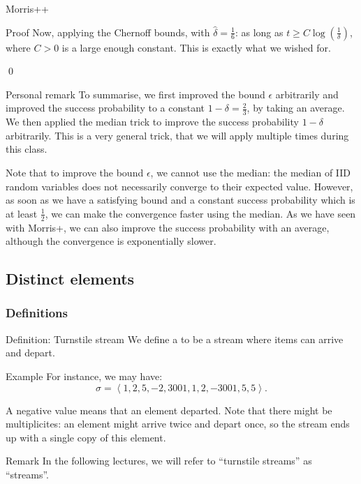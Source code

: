 \documentclass[a4paper]{article}
\begin{document}
\begin{parag}{Morris++}
\begin{subparag}{Proof}
        Now, applying the Chernoff bounds, with $\hat{\delta} = \frac{1}{6}$: 
        as long as $t \geq C \log\left(\frac{1}{\delta}\right)$, where $C > 0$ is a large enough constant. This is exactly what we wished for.
        
        \qed
    \end{subparag}

    \begin{subparag}{Personal remark}
        To summarise, we first improved the bound $\epsilon$ arbitrarily and improved the success probability to a constant $1 - \delta = \frac{2}{3}$, by taking an average. We then applied the median trick to improve the success probability $1 - \delta$ arbitrarily. This is a very general trick, that we will apply multiple times during this class.

        Note that to improve the bound $\epsilon$, we cannot use the median: the median of IID random variables does not necessarily converge to their expected value. However, as soon as we have a satisfying bound and a constant success probability which is at least $\frac{1}{2}$, we can make the convergence faster using the median. As we have seen with Morris+, we can also improve the success probability with an average, although the convergence is exponentially slower.
    \end{subparag}
\end{parag}

\subsection{Distinct elements}
\subsubsection{Definitions}

\begin{parag}{Definition: Turnstile stream}
    We define a  to be a stream where items can arrive and depart.

    \begin{subparag}{Example}
        For instance, we may have:
        \[\sigma = \left\langle 1, 2, 5, -2, 3001, 1, 2, -3001, 5, 5 \right\rangle.\]
        
        A negative value means that an element departed. Note that there might be multiplicites: an element might arrive twice and depart once, so the stream ends up with a single copy of this element.
    \end{subparag}

    \begin{subparag}{Remark}
        In the following lectures, we will refer to ``turnstile streams'' as ``streams''.
    \end{subparag}
\end{parag}
\end{document}
